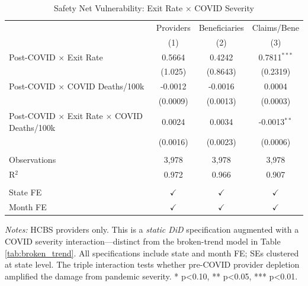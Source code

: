 
\begin{table}[htbp]
   \caption{\label{tab:vulnerability} Safety Net Vulnerability: Exit Rate $\times$ COVID Severity}
   \bigskip
   \centering
   \begin{tabular}{lccc}
      \toprule
                                                                 & Providers      & Beneficiaries      & Claims/Bene \\
                                                                 & (1)            & (2)                & (3)\\
      \midrule
      Post-COVID $\times$ Exit Rate                              & 0.5664         & 0.4242             & 0.7811$^{***}$\\
                                                                 & (1.025)        & (0.8643)           & (0.2319)\\
      Post-COVID $\times$ COVID Deaths/100k                      & -0.0012        & -0.0016            & 0.0004\\
                                                                 & (0.0009)       & (0.0013)           & (0.0003)\\
      Post-COVID $\times$ Exit Rate $\times$ COVID Deaths/100k   & 0.0024         & 0.0034             & -0.0013$^{**}$\\
                                                                 & (0.0016)       & (0.0023)           & (0.0006)\\
       \\
      Observations                                               & 3,978          & 3,978              & 3,978\\
      R$^2$                                                      & 0.972          & 0.966              & 0.907\\
       \\
      State FE                                                   & $\checkmark$   & $\checkmark$       & $\checkmark$\\
      Month FE                                                   & $\checkmark$   & $\checkmark$       & $\checkmark$\\
      \bottomrule
   \end{tabular}

   \par \raggedright
   \textit{Notes:} HCBS providers only. This is a \emph{static DiD} specification augmented with a COVID severity interaction---distinct from the broken-trend model in Table \ref{tab:broken_trend}. All specifications include state and month FE; SEs clustered at state level. The triple interaction tests whether pre-COVID provider depletion amplified the damage from pandemic severity. * p<0.10, ** p<0.05, *** p<0.01.
\end{table}


